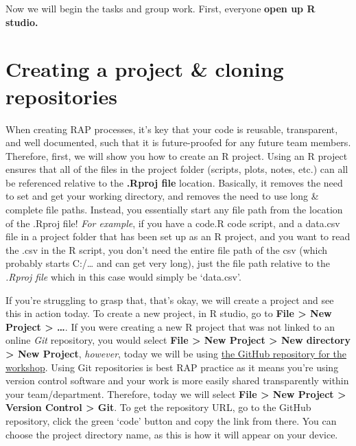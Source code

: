 \documentclass[
  12pt,
]{article}
\begin{document}
Now we will begin the tasks and group work. First, everyone \textbf{open
up R studio.}

\hypertarget{creating-a-project-cloning-repositories}{%
\section{Creating a project \& cloning
repositories}\label{creating-a-project-cloning-repositories}}

When creating RAP processes, it's key that your code is reusable,
transparent, and well documented, such that it is future-proofed for any
future team members. Therefore, first, we will show you how to create an
R project. Using an R project ensures that all of the files in the
project folder (scripts, plots, notes, etc.) can all be referenced
relative to the \textbf{.Rproj file} location. Basically, it removes the
need to set and get your working directory, and removes the need to use
long \& complete file paths. Instead, you essentially start any file
path from the location of the .Rproj file! \emph{For example}, if you
have a code.R code script, and a data.csv file in a project folder that
has been set up as an R project, and you want to read the .csv in the R
script, you don't need the entire file path of the csv (which probably
starts C:/\ldots{} and can get very long), just the file path relative
to the \emph{.Rproj file} which in this case would simply be `data.csv'.

If you're struggling to grasp that, that's okay, we will create a
project and see this in action today. To create a new project, in R
studio, go to \textbf{File \textgreater{} New Project \textgreater{}
\ldots{}}. If you were creating a new R project that was not linked to
an online \emph{Git} repository, you would select \textbf{File
\textgreater{} New Project \textgreater{} New directory \textgreater{}
New Project}, \emph{however}, today we will be using
\href{https://github.com/dfe-analytical-services/techskills_workshops}{the
GitHub repository for the workshop}. Using Git repositories is best RAP
practice as it means you're using version control software and your work
is more easily shared transparently within your team/department.
Therefore, today we will select \textbf{File \textgreater{} New Project
\textgreater{} Version Control \textgreater{} Git}. To get the
repository URL, go to the GitHub repository, click the green `code'
button and copy the link from there. You can choose the project
directory name, as this is how it will appear on your device.
\end{document}
